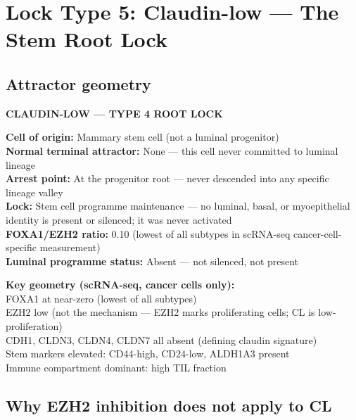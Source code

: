 \documentclass[12pt, a4paper]{article}
\begin{document}
\section{Lock Type 5: Claudin-low --- The Stem Root Lock}

\subsection{Attractor geometry}

\begin{center}
\colorbox{mechanismbox}{
\begin{minipage}{0.85\textwidth}
\vspace{0.5em}
\textbf{CLAUDIN-LOW --- TYPE 4 ROOT LOCK}

\medskip
\textbf{Cell of origin:} Mammary stem cell
(not a luminal progenitor)\\
\textbf{Normal terminal attractor:} None --- this
cell never committed to luminal lineage\\
\textbf{Arrest point:} At the progenitor root ---
never descended into any specific lineage valley\\
\textbf{Lock:} Stem cell programme maintenance ---
no luminal, basal, or myoepithelial identity is
present or silenced; it was never activated\\
\textbf{FOXA1/EZH2 ratio:} 0.10 (lowest of all subtypes
in scRNA-seq cancer-cell-specific measurement)\\
\textbf{Luminal programme status:} Absent ---
not silenced, not present

\medskip
\textbf{Key geometry (scRNA-seq, cancer cells only):}\\
FOXA1 at near-zero (lowest of all subtypes)\\
EZH2 low (not the mechanism --- EZH2 marks
proliferating cells; CL is low-proliferation)\\
CDH1, CLDN3, CLDN4, CLDN7 all absent
(defining claudin signature)\\
Stem markers elevated: CD44-high, CD24-low,
ALDH1A3 present\\
Immune compartment dominant: high TIL fraction
\vspace{0.5em}
\end{minipage}
}
\end{center}

\subsection{Why EZH2 inhibition does not apply to CL}
\end{document}
